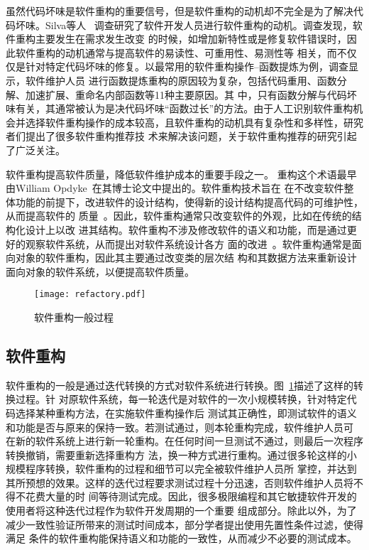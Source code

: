 虽然代码坏味是软件重构的重要信号，但是软件重构的动机却不完全是为了解决代码坏味。Silva等人
~\cite{Silva2016}调查研究了软件开发人员进行软件重构的动机。调查发现，软件重构主要发生在需求发生改变
的时候，如增加新特性或是修复软件错误时，因此软件重构的动机通常与提高软件的易读性、可重用性、易测性等
相关，而不仅仅是针对特定代码坏味的修复。以最常用的软件重构操作--函数提炼为例，调查显示，软件维护人员
进行函数提炼重构的原因较为复杂，包括代码重用、函数分解、加速扩展、重命名内部函数等11种主要原因。其
中，只有函数分解与代码坏味有关，其通常被认为是决代码坏味``函数过长''的方法。由于人工识别软件重构机
会并选择软件重构操作的成本较高，且软件重构的动机具有复杂性和多样性，研究者们提出了很多软件重构推荐技
术来解决该问题，关于软件重构推荐的研究引起了广泛关注。

软件重构提高软件质量，降低软件维护成本的重要手段之一。
重构这个术语最早由William Opdyke~\cite{opdyke1992refactoring}在其博士论文中提出的。软件重构技术旨在
在不改变软件整体功能的前提下，改进软件的设计结构，使得新的设计结构提高代码的可维护性，从而提高软件的
质量~\cite{fowler1999refactoring}。因此，软件重构通常只改变软件的外观，比如在传统的结构化设计上以改
进其结构。软件重构不涉及修改软件的语义和功能，而是通过更好的观察软件系统，从而提出对软件系统设计各方
面的改进~\cite{chikofsky1990reverse}。软件重构通常是面向对象的软件重构，因此其主要通过改变类的层次结
构和其数据方法来重新设计面向对象的软件系统，以便提高软件质量。
\begin{figure}
  \centering
  \texttt{[image: refactory.pdf]}  
  \caption{\label{fig:refactory}软件重构一般过程}
\end{figure}
\subsection{软件重构}
软件重构的一般是通过迭代转换的方式对软件系统进行转换。图~\ref{fig:refactory}描述了这样的转换过程。针
对原软件系统，每一轮迭代是对软件的一次小规模转换，针对特定代码选择某种重构方法，在实施软件重构操作后
测试其正确性，即测试软件的语义和功能是否与原来的保持一致。若测试通过，则本轮重构完成，软件维护人员可
在新的软件系统上进行新一轮重构。在任何时间一旦测试不通过，则最后一次程序转换撤销，需要重新选择重构方
法，换一种方式进行重构。通过很多轮这样的小规模程序转换，软件重构的过程和细节可以完全被软件维护人员所
掌控，并达到其所预想的效果。这样的迭代过程要求测试过程十分迅速，否则软件维护人员将不得不花费大量的时
间等待测试完成。因此，很多极限编程和其它敏捷软件开发的使用者将这种迭代过程作为软件开发周期的一个重要
组成部分。除此以外，为了减少一致性验证所带来的测试时间成本，部分学者提出使用先置性条件过滤，使得满足
条件的软件重构能保持语义和功能的一致性，从而减少不必要的测试成本。

